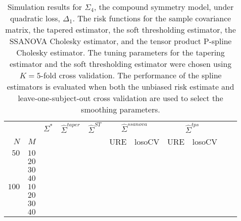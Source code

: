 \documentclass[12pt]{article}
\newcommand{\ra}[1]{\renewcommand{\arraystretch}{#1}}
\theoremstyle{definition}
\begin{document}
\begin{table}\centering
\ra{1.3}
\caption{Simulation results for $\Sigma_4$, the compound symmetry model, under quadratic loss, $\Delta_1$. The risk functions for the sample covariance matrix, the tapered estimator, the soft thresholding estimator, the SSANOVA Cholesky estimator, and the tensor product P-spline Cholesky estimator. The tuning parameters for the tapering estimator and the soft thresholding estimator were chosen using $K = 5$-fold cross validation. The performance of the spline estimators is evaluated when both the unbiased risk estimate and leave-one-subject-out cross validation are used to select the smoothing parameters.}
\begin{tabular}{@{}rrrcrcrrcrr@{}}\toprule
   &            & \multicolumn{1}{c}{$\Sigma^*$}  & \multicolumn{1}{c}{$\hat{\Sigma}^{taper}$} &\multicolumn{1}{c}{$\hat{\Sigma}^{ST}$} &\multicolumn{2}{c}{ $\hat{\Sigma}^{ssanova}$} &  \multicolumn{2}{c}{ $\hat{\Sigma}^{tps}$}\\
$N$ & $M$ 	&	  &	& & \multicolumn{1}{c}{\mbox{URE}} & \multicolumn{1}{c}{\mbox{losoCV}} &\multicolumn{1}{c}{\mbox{URE}} & \multicolumn{1}{c}{\mbox{losoCV}}\\ \midrule
$50$ & $10$\\
  & $20$  &&&&&&&\\
  & $30$   &&&&&&&\\
& $40$   &&&&&&&\\ 
$100$ & $10$ &&&&&&&\\
& $20$  &&&&&&& \\
& $30$  &&&&&&& \\
& $40$  &&&&&&& \\ 
\bottomrule
\end{tabular}
\end{table}
\end{document}
